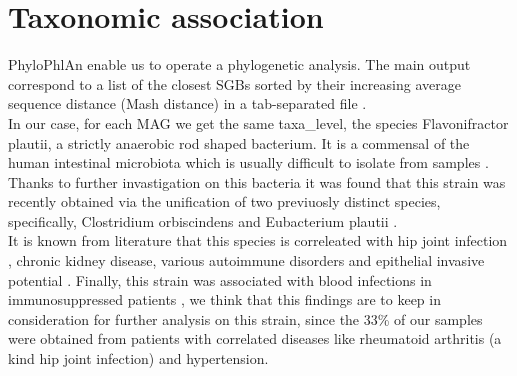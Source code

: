 \documentclass[a4paper,titlepage, oneside]{book}
\newcommand{\code}[1]{\colorbox{light-gray}{\texttt{#1}}}
\begin{document}
\section{Taxonomic association}
PhyloPhlAn enable us to operate a phylogenetic analysis. The main output correspond to a list of the closest SGBs sorted by their increasing average sequence distance (Mash distance) in a tab-separated file \cite{PhyloGuide}. 
\\In our case, for each MAG we get the same taxa\_level, the species Flavonifractor plautii, a strictly anaerobic rod shaped bacterium. It is a commensal of the human intestinal microbiota which is  usually difficult to isolate from samples \cite{Plauti}.
\\Thanks to further invastigation on this bacteria it was found that this strain was recently obtained via the unification of two previuosly distinct species, specifically, Clostridium orbiscindens and Eubacterium plautii \cite{Unification}.
\\It is known from literature that this species is correleated with hip joint infection \cite{HipJoint}, chronic kidney disease, various autoimmune disorders and epithelial invasive potential \cite{PlautiiDiseases}. Finally, this strain was associated with blood infections in immunosuppressed patients \cite{PlautiiBlood},
we think that this findings are to keep in consideration for further analysis on this strain, since the 33\% of our samples were obtained from patients with correlated diseases like rheumatoid arthritis (a kind hip joint infection) and hypertension.
\end{document}
